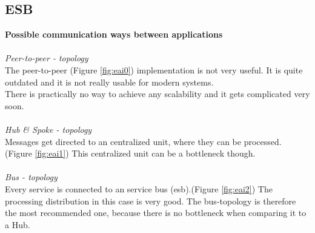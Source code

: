 \documentclass[12pt]{article}
\begin{document}
\subsection{ESB}
\label{sec:esb}
\textbf{Possible communication ways between applications} \\ \\
\textit{Peer-to-peer - topology}\\
The peer-to-peer (Figure \ref{fig:eai0}) implementation is not very useful. It is quite outdated and it is not really usable for modern systems. \\
There is practically no way to achieve any scalability and it gets complicated very soon. \\\\
\textit{Hub \& Spoke  - topology}\\
Messages get directed to an centralized unit, where they can be processed. (Figure \ref{fig:eai1}) This centralized unit can be a bottleneck though. \\\\
\textit{Bus - topology}\\
Every service is connected to an service bus (\gls{esb}).(Figure \ref{fig:eai2}) The processing distribution in this case is very good. The bus-topology is therefore the most recommended one, because there is no bottleneck when comparing it to a Hub.
\end{document}
